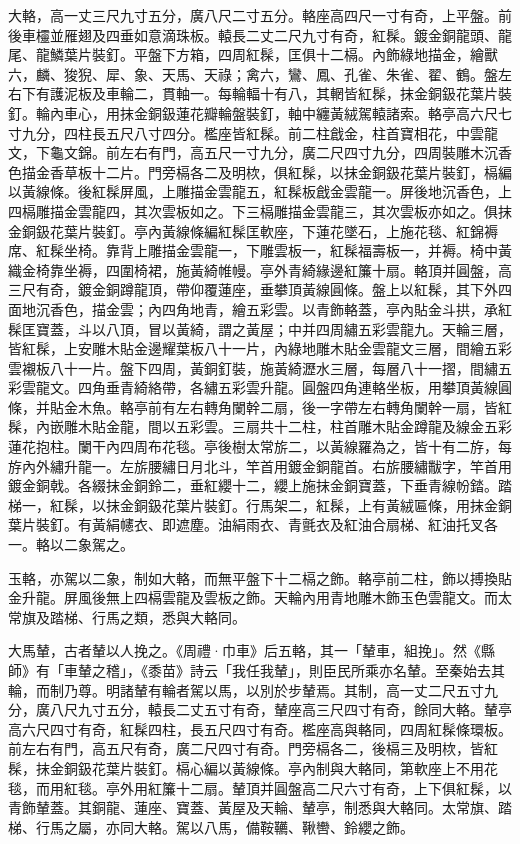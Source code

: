 大輅，高一丈三尺九寸五分，廣八尺二寸五分。輅座高四尺一寸有奇，上平盤。前後車欞並雁翅及四垂如意滴珠板。轅長二丈二尺九寸有奇，紅髹。鍍金銅龍頭、龍尾、龍鱗葉片裝釘。平盤下方箱，四周紅髹，匡俱十二槅。內飾綠地描金，繪獸六，麟、狻猊、犀、象、天馬、天祿；禽六，鸞、鳳、孔雀、朱雀、翟、鶴。盤左右下有護泥板及車輪二，貫軸一。每輪輻十有八，其輞皆紅髹，抹金銅鈒花葉片裝釘。輪內車心，用抹金銅鈒蓮花瓣輪盤裝釘，軸中纏黃絨駕轅諸索。輅亭高六尺七寸九分，四柱長五尺八寸四分。檻座皆紅髹。前二柱戧金，柱首寶相花，中雲龍文，下龜文錦。前左右有門，高五尺一寸九分，廣二尺四寸九分，四周裝雕木沉香色描金香草板十二片。門旁槅各二及明栨，俱紅髹，以抹金銅鈒花葉片裝釘，槅編以黃線條。後紅髹屏風，上雕描金雲龍五，紅髹板戧金雲龍一。屏後地沉香色，上四槅雕描金雲龍四，其次雲板如之。下三槅雕描金雲龍三，其次雲板亦如之。俱抹金銅鈒花葉片裝釘。亭內黃線條編紅髹匡軟座，下蓮花墜石，上施花毯、紅錦褥席、紅髹坐椅。靠背上雕描金雲龍一，下雕雲板一，紅髹福壽板一，并褥。椅中黃織金椅靠坐褥，四圍椅裙，施黃綺帷幔。亭外青綺緣邊紅簾十扇。輅頂并圓盤，高三尺有奇，鍍金銅蹲龍頂，帶仰覆蓮座，垂攀頂黃線圓條。盤上以紅髹，其下外四面地沉香色，描金雲；內四角地青，繪五彩雲。以青飾輅蓋，亭內貼金斗拱，承紅髹匡寶蓋，斗以八頂，冒以黃綺，謂之黃屋；中并四周繡五彩雲龍九。天輪三層，皆紅髹，上安雕木貼金邊耀葉板八十一片，內綠地雕木貼金雲龍文三層，間繪五彩雲襯板八十一片。盤下四周，黃銅釘裝，施黃綺瀝水三層，每層八十一摺，間繡五彩雲龍文。四角垂青綺絡帶，各繡五彩雲升龍。圓盤四角連輅坐板，用攀頂黃線圓條，并貼金木魚。輅亭前有左右轉角闌幹二扇，後一字帶左右轉角闌幹一扇，皆紅髹，內嵌雕木貼金龍，間以五彩雲。三扇共十二柱，柱首雕木貼金蹲龍及線金五彩蓮花抱柱。闌干內四周布花毯。亭後樹太常旂二，以黃線羅為之，皆十有二斿，每斿內外繡升龍一。左旂腰繡日月北斗，竿首用鍍金銅龍首。右旂腰繡黻字，竿首用鍍金銅戟。各綴抹金銅鈴二，垂紅纓十二，纓上施抹金銅寶蓋，下垂青線帉錔。踏梯一，紅髹，以抹金銅鈒花葉片裝釘。行馬架二，紅髹，上有黃絨匾條，用抹金銅葉片裝釘。有黃絹幰衣、即遮塵。油絹雨衣、青氈衣及紅油合扇梯、紅油托叉各一。輅以二象駕之。

玉輅，亦駕以二象，制如大輅，而無平盤下十二槅之飾。輅亭前二柱，飾以搏換貼金升龍。屏風後無上四槅雲龍及雲板之飾。天輪內用青地雕木飾玉色雲龍文。而太常旗及踏梯、行馬之類，悉與大輅同。

大馬輦，古者輦以人挽之。《周禮·巾車》后五輅，其一「輦車，組挽」。然《縣師》有「車輦之稽」，《黍苗》詩云「我任我輦」，則臣民所乘亦名輦。至秦始去其輪，而制乃尊。明諸輦有輪者駕以馬，以別於步輦焉。其制，高一丈二尺五寸九分，廣八尺九寸五分，轅長二丈五寸有奇，輦座高三尺四寸有奇，餘同大輅。輦亭高六尺四寸有奇，紅髹四柱，長五尺四寸有奇。檻座高與輅同，四周紅髹條環板。前左右有門，高五尺有奇，廣二尺四寸有奇。門旁槅各二，後槅三及明栨，皆紅髹，抹金銅鈒花葉片裝釘。槅心編以黃線條。亭內制與大輅同，第軟座上不用花毯，而用紅毯。亭外用紅簾十二扇。輦頂并圓盤高二尺六寸有奇，上下俱紅髹，以青飾輦蓋。其銅龍、蓮座、寶蓋、黃屋及天輪、輦亭，制悉與大輅同。太常旗、踏梯、行馬之屬，亦同大輅。駕以八馬，備鞍韉、鞦轡、鈴纓之飾。

